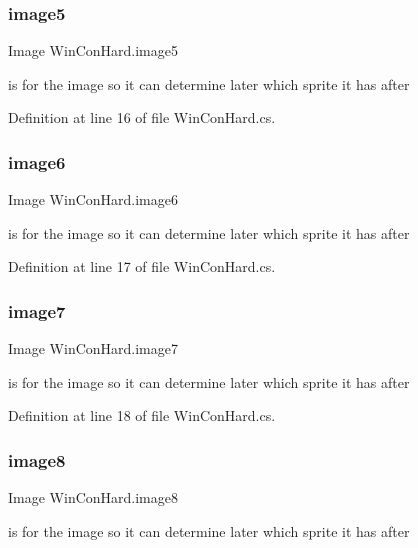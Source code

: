 \subsubsection{\texorpdfstring{image5}{image5}}
{\footnotesize\ttfamily Image Win\+Con\+Hard.\+image5}

is for the image so it can determine later which sprite it has after 

Definition at line 16 of file Win\+Con\+Hard.\+cs.

\mbox{\label{class_win_con_hard_a48aeec1cb9bc2a00609d5be92c169d75}} 
\subsubsection{\texorpdfstring{image6}{image6}}
{\footnotesize\ttfamily Image Win\+Con\+Hard.\+image6}

is for the image so it can determine later which sprite it has after 

Definition at line 17 of file Win\+Con\+Hard.\+cs.

\mbox{\label{class_win_con_hard_ac97b920408fdbea74474c70f1b2ab775}} 
\subsubsection{\texorpdfstring{image7}{image7}}
{\footnotesize\ttfamily Image Win\+Con\+Hard.\+image7}

is for the image so it can determine later which sprite it has after 

Definition at line 18 of file Win\+Con\+Hard.\+cs.

\mbox{\label{class_win_con_hard_af90e4816d004bcbaaca8f1fd884f0e18}} 
\subsubsection{\texorpdfstring{image8}{image8}}
{\footnotesize\ttfamily Image Win\+Con\+Hard.\+image8}

is for the image so it can determine later which sprite it has after 

